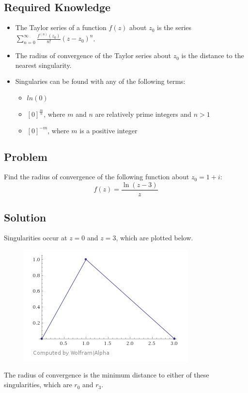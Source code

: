 \documentclass[12pt]{article}
\begin{document}
\subsection{Required Knowledge}
\begin{itemize}
    \item The Taylor series of a function $f(z)$ about $z_0$ is the series $\sum_{n=0}^{\infty}\frac{f^{(n)}(z_0)}{n!}(z-z_0)^n$.
    \item The radius of convergence of the Taylor series about $z_0$ is the distance to the nearest singularity.
	\item Singularies can be found with any of the following terms:
	\begin{itemize}
		\item $ln(0)$
		\item $[0]^{\frac{m}{n}}$, where $m$ and $n$ are relatively prime integers and $n>1$
		\item $[0]^{-m}$, where $m$ is a positive integer
	\end{itemize}
\end{itemize}
\subsection{Problem}
Find the radius of convergence of the following function about $z_0=1+i$:
\begin{equation}
	f(z)=\frac{\ln(z-3)}{z}
\end{equation}

\subsection{Solution}
Singularities occur at $z=0$ and $z=3$, which are plotted below.
\begin{figure}[H]
    \includegraphics{Topic8Graph.png}
\end{figure}

The radius of convergence is the minimum distance to either of these singularities, which are $r_0$ and $r_3$.
\end{document}
